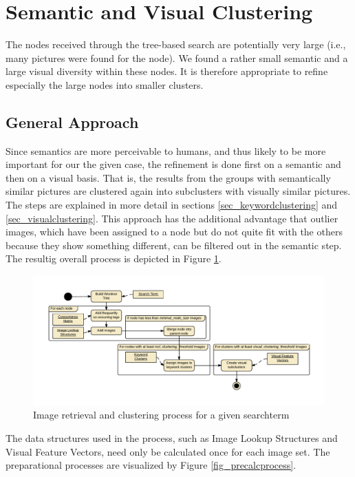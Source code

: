 %
\section{Semantic and Visual Clustering}
\label{sec_inhalt}

The nodes received through the tree-based search are potentially very large (i.e., many pictures were found for the node). We found a rather small semantic and a large visual diversity within these nodes. It is therefore appropriate to refine especially the large nodes into smaller clusters.

\subsection{General Approach}
Since semantics are more perceivable to humans, and thus likely to be more important for our the given case, the refinement is done first on a semantic and then on a visual basis. That is, the results from the groups with semantically similar pictures are clustered again into subclusters with visually similar pictures. The steps are explained in more detail in sections \ref{sec_keywordclustering} and \ref{sec_visualclustering}.
This approach has the additional advantage that outlier images, which have been assigned to a node but do not quite fit with the others because they show something different, can be filtered out in the semantic step. \\
The resultig overall process is depicted in Figure \ref{fig_overallprocess}. 

\begin{figure}[h]
\centering
\includegraphics[width=\textwidth]{images/searchprocess_diagram_color.pdf}
\caption{Image retrieval and clustering process for a given searchterm}
\label{fig_overallprocess}
\end{figure}

The data structures used in the process, such as Image Lookup Structures and Visual Feature Vectors, need only be calculated once for each image set. The preparational processes are visualized by Figure \ref{fig_precalcprocess}.

